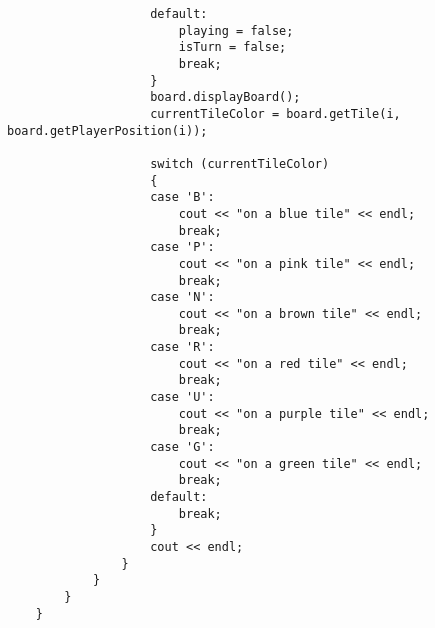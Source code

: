 \documentclass{article}
\begin{document}
\begin{verbatim}
                    default:
                        playing = false;
                        isTurn = false;
                        break;
                    }
                    board.displayBoard();
                    currentTileColor = board.getTile(i, board.getPlayerPosition(i));
    
                    switch (currentTileColor)
                    {
                    case 'B':
                        cout << "on a blue tile" << endl;
                        break;
                    case 'P':
                        cout << "on a pink tile" << endl;
                        break;
                    case 'N':
                        cout << "on a brown tile" << endl;
                        break;
                    case 'R':
                        cout << "on a red tile" << endl;
                        break;
                    case 'U':
                        cout << "on a purple tile" << endl;
                        break;
                    case 'G':
                        cout << "on a green tile" << endl;
                        break;
                    default:
                        break;
                    }
                    cout << endl;
                }
            }
        }
    }
\end{verbatim}
\end{document}
